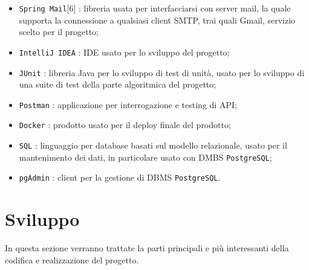 \begin{itemize}
    	\item \texttt{Spring Mail}[6] : libreria usata per interfacciarsi con server mail, la quale supporta la connessione a qualsiasi client SMTP, trai quali Gmail, servizio scelto per il progetto;
    	 \item \texttt{IntelliJ IDEA} : IDE usato per lo sviluppo del progetto;
    	\item \texttt{JUnit} : libreria Java per lo sviluppo di test di unità, usato per lo sviluppo di una suite di test della parte algoritmica del progetto;
    	\item \texttt{Postman} : applicazione per interrogazione e testing di API;
    	\item \texttt{Docker} : prodotto usato per il deploy finale del prodotto;
    	\item \texttt{SQL} : linguaggio per database basati sul modello relazionale, usato per il mantenimento dei dati, in particolare usato con DMBS  \texttt{PostgreSQL};
    	\item \texttt{pgAdmin} : client per la gestione di DBMS \texttt{PostgreSQL}.
    \end{itemize}
    
    
    
    
    
    
\section{Sviluppo}
	In questa sezione verranno trattate la parti principali e più interessanti della codifica e realizzazione del progetto.
	

